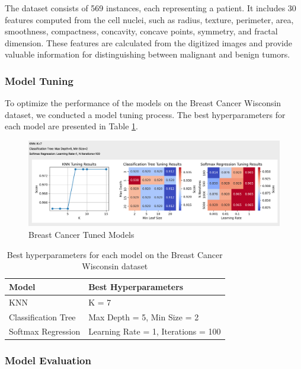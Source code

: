 \documentclass[letterpaper,10pt]{article}
\begin{document}
The dataset consists of 569 instances, each representing a patient. It includes 30 features computed from the cell nuclei, such as radius, texture, perimeter, area, smoothness, compactness, concavity, concave points, symmetry, and fractal dimension. These features are calculated from the digitized images and provide valuable information for distinguishing between malignant and benign tumors.

\subsubsection{Model Tuning}

To optimize the performance of the models on the Breast Cancer Wisconsin dataset, we conducted a model tuning process. The best hyperparameters for each model are presented in Table \ref{tab:breast_cancer_tuning}.
\begin{figure}[ht]
    \centering
    \includegraphics[width=1.0\textwidth]{bcancer_tuned.png}
    \caption{Breast Cancer Tuned Models}
    \label{bcancer_tuned}
\end{figure}
\begin{table}[h]
\centering
\caption{Best hyperparameters for each model on the Breast Cancer Wisconsin dataset}
\label{tab:breast_cancer_tuning}
\begin{tabular}{|l|l|}
\hline
\textbf{Model} & \textbf{Best Hyperparameters} \\
\hline
KNN & K = 7 \\
\hline
Classification Tree & Max Depth = 5, Min Size = 2 \\
\hline
Softmax Regression & Learning Rate = 1, Iterations = 100 \\
\hline
\end{tabular}
\end{table}

\subsubsection{Model Evaluation}
\end{document}
